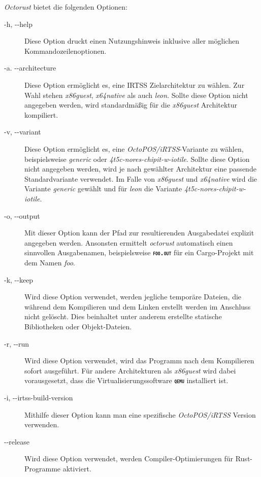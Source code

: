 \textit{Octorust} bietet die folgenden Optionen:
\begin{description}

	\item[-h, -{}-help]
	Diese Option druckt einen Nutzungshinweis inklusive aller möglichen Kommandozeilenoptionen.
	
	\item[-a. -{}-architecture]
	Diese Option ermöglicht es, eine IRTSS Zielarchitektur zu wählen. Zur Wahl stehen \textit{x86guest},
	\textit{x64native} als auch \textit{leon}.
	Sollte diese Option nicht angegeben werden, wird standardmäßig für die \textit{x86guest} Architektur kompiliert.
	
	\item[-v, -{}-variant]
	Diese Option ermöglicht es, eine \textit{OctoPOS/iRTSS}-Variante zu wählen,
	beispielsweise \textit{generic} oder \textit{4t5c-nores-chipit-w-iotile}.
	Sollte diese Option nicht angegeben werden, wird je nach gewählter Architektur
	eine passende Standardvariante verwendet.
	Im Falle von \textit{x86guest} und \textit{x64native} wird die Variante \textit{generic} gewählt und für 
	\textit{leon} die Variante \textit{4t5c-nores-chipit-w-iotile}.
	
	\item[-o, -{}-output]
	Mit dieser Option kann der Pfad zur resultierenden Ausgabedatei explizit angegeben	werden.
	Ansonsten ermittelt \textit{octorust} automatisch einen sinnvollen Ausgabenamen,
	beispielsweise \texttt{\textsc{\textbf{foo.out}}} für ein Cargo-Projekt mit dem Namen
	\textit{foo}.
	
	\item[-k, -{}-keep]
	Wird diese Option verwendet, werden jegliche temporäre Dateien,
	die während dem Kompilieren und dem Linken erstellt werden im
	Anschluss nicht gelöscht.
	Dies beinhaltet unter anderem erstellte statische Bibliotheken oder Objekt-Dateien.
	
	\item[-r, -{}-run]
	Wird diese Option verwendet, wird das Programm nach dem Kompilieren sofort ausgeführt.
	Für andere Architekturen als \textit{x86guest} wird dabei vorausgesetzt,
	dass die Virtualisierungssoftware \texttt{\textsc{\textbf{qemu}}} installiert ist.
	
	\item[-i, -{}-irtss-build-version]
	Mithilfe dieser Option kann man eine spezifische \textit{OctoPOS/iRTSS} Version verwenden.
	
	\item[-{}-release]
	Wird diese Option verwendet, werden Compiler-Optimierungen für Rust-Programme aktiviert.
	

\end{description}
